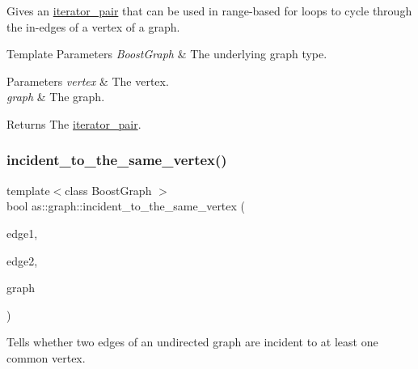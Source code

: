 Gives an \hyperlink{classas_1_1iterator__pair}{iterator\+\_\+pair} that can be used in range-\/based for loops to cycle through the in-\/edges of a vertex of a graph. 


\begin{DoxyTemplParams}{Template Parameters}
{\em Boost\+Graph} & The underlying graph type. \\
\hline
\end{DoxyTemplParams}

\begin{DoxyParams}{Parameters}
{\em vertex} & The vertex. \\
\hline
{\em graph} & The graph. \\
\hline
\end{DoxyParams}
\begin{DoxyReturn}{Returns}
The \hyperlink{classas_1_1iterator__pair}{iterator\+\_\+pair}. 
\end{DoxyReturn}
\mbox{\label{namespaceas_1_1graph_ac0b52ec1e242ac547157a42aac39e21a}} 
\subsubsection{\texorpdfstring{incident\+\_\+to\+\_\+the\+\_\+same\+\_\+vertex()}{incident\_to\_the\_same\_vertex()}}
{\footnotesize\ttfamily template$<$class Boost\+Graph $>$ \\
bool as\+::graph\+::incident\+\_\+to\+\_\+the\+\_\+same\+\_\+vertex (\begin{DoxyParamCaption}\item[{const typename boost\+::graph\+\_\+traits$<$ Boost\+Graph $>$\+::edge\+\_\+descriptor \&}]{edge1,  }\item[{const typename boost\+::graph\+\_\+traits$<$ Boost\+Graph $>$\+::edge\+\_\+descriptor \&}]{edge2,  }\item[{const Boost\+Graph \&}]{graph }\end{DoxyParamCaption})\hspace{0.3cm}{\ttfamily [inline]}}



Tells whether two edges of an undirected graph are incident to at least one common vertex. 



